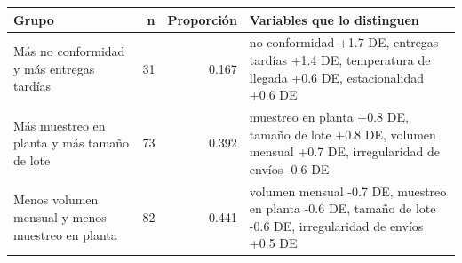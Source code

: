 \begin{tabular}{lrrl}
\toprule
Grupo & n & Proporción & Variables que lo distinguen \\
\midrule
Más no conformidad y más entregas tardías & 31 & 0.167 & no conformidad +1.7 DE, entregas tardías +1.4 DE, temperatura de llegada +0.6 DE, estacionalidad +0.6 DE \\
Más muestreo en planta y más tamaño de lote & 73 & 0.392 & muestreo en planta +0.8 DE, tamaño de lote +0.8 DE, volumen mensual +0.7 DE, irregularidad de envíos -0.6 DE \\
Menos volumen mensual y menos muestreo en planta & 82 & 0.441 & volumen mensual -0.7 DE, muestreo en planta -0.6 DE, tamaño de lote -0.6 DE, irregularidad de envíos +0.5 DE \\
\bottomrule
\end{tabular}
